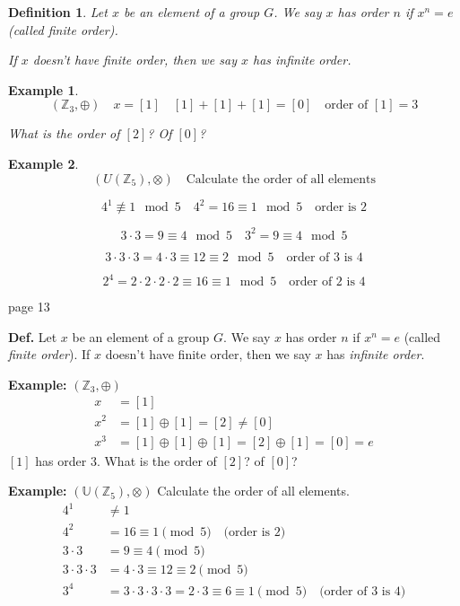 \documentclass{article}
\begin{document}
\newtheorem*{definition}{Definition}
\begin{definition}
    Let $x$ be an element of a group $G$. We say $x$ has order $n$ if $x^n = e$ (called finite order).

    If $x$ doesn't have finite order, then we say $x$ has infinite order.
\end{definition}
\newtheorem{example}{Example}
\begin{example}
    \[
    (\mathbb{Z}_3, \oplus) \quad x = [1] \quad [1] + [1] + [1] = [0] \quad \text{order of } [1] = 3
    \]

    What is the order of $[2]$? Of $[0]$?
\end{example}
\newtheorem{example 2}{Example }
\begin{example}
    \[
    (U(\mathbb{Z}_5), \otimes) \quad \text{Calculate the order of all elements}
    \]

    \[
    4^1 \not\equiv 1 \mod 5 \quad 4^2 = 16 \equiv 1 \mod 5 \quad \text{order is } 2
    \]

    \[
    3 \cdot 3 = 9 \equiv 4 \mod 5 \quad 3^2 = 9 \equiv 4 \mod 5
    \]

    \[
    3 \cdot 3 \cdot 3 = 4 \cdot 3 \equiv 12 \equiv 2 \mod 5 \quad \text{order of 3 is 4}
    \]

    \[
    2^4 = 2 \cdot 2 \cdot 2 \cdot 2 \equiv 16 \equiv 1 \mod 5 \quad \text{order of 2 is 4}
    \]
\end{example}





\newpage
\noindent page 13

\textbf{Def.} Let $x$ be an element of a group $G$. We say $x$ has order $n$ if $x^n = e$ (called \textit{finite order}). If $x$ doesn't have finite order, then we say $x$ has \textit{infinite order}.

\textbf{Example:} $(\mathbb{Z}_3, \oplus)$
\[
\begin{aligned}
    x &= [1] \\
    x^2 &= [1] \oplus [1] = [2] \neq [0] \\
    x^3 &= [1] \oplus [1] \oplus [1] = [2] \oplus [1] = [0] = e
\end{aligned}
\]
$[1]$ has order $3$. What is the order of $[2]$? of $[0]$?

\textbf{Example:} $(\mathbb{U}(\mathbb{Z}_5), \otimes)$ Calculate the order of all elements.
\[
\begin{aligned}
    4^1 &\neq 1 \\
    4^2 &= 16 \equiv 1 \pmod{5} \quad \text{(order is 2)} \\
    3 \cdot 3 &= 9 \equiv 4 \pmod{5} \\
    3 \cdot 3 \cdot 3 &= 4 \cdot 3 \equiv 12 \equiv 2 \pmod{5} \\
    3^4 &= 3 \cdot 3 \cdot 3 \cdot 3 = 2 \cdot 3 \equiv 6 \equiv 1 \pmod{5} \quad \text{(order of 3 is 4)}
\end{aligned}
\]
\end{document}
